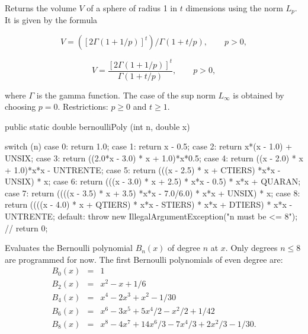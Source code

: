  \begin{tabb} Returns the volume $V$ of a sphere of radius 1 in $t$ dimensions
  using the norm $L_p$. It is given by the formula
\begin{htmlonly}
\[
   V = ([2\Gamma (1 + 1/p)]^t)/\Gamma(1 + t/p), \qquad p > 0,
\]
\end{htmlonly}
\begin{latexonly}
\[
       V = \frac{\left[2 \Gamma (1 + 1/p)\right]^t}
             {\Gamma\left (1 + t/p\right)}, \qquad p > 0,
\]
\end{latexonly}%
where $\Gamma$ is the gamma function.
  The case of the sup norm $L_\infty$ is  obtained by choosing $p=0$.
  Restrictions: $p\ge 0$ and $t\ge 1$.
  \end{tabb}
  \begin{htmlonly}
 \end{htmlonly}
\begin{code}

   public static double bernoulliPoly (int n, double x) \begin{hide} {
      switch (n) {
      case 0:
         return 1.0;
      case 1:
         return x - 0.5;
      case 2:
         return x*(x - 1.0) + UNSIX;
      case 3:
         return ((2.0*x - 3.0) * x + 1.0)*x*0.5;
      case 4:
         return ((x - 2.0) * x + 1.0)*x*x - UNTRENTE;
      case 5:
         return (((x - 2.5) * x + CTIERS) *x*x - UNSIX) * x;
      case 6:
         return (((x - 3.0) * x + 2.5) * x*x - 0.5) * x*x + QUARAN;
      case 7:
         return ((((x - 3.5) * x + 3.5) *x*x - 7.0/6.0) * x*x + UNSIX) * x;
      case 8:
         return ((((x - 4.0) * x +
                  QTIERS) * x*x - STIERS) * x*x + DTIERS) * x*x - UNTRENTE;
      default:
         throw new IllegalArgumentException("n must be <= 8");
      }
    //  return 0;
    }\end{hide}
\end{code}
\begin{tabb} Evaluates the Bernoulli polynomial $B_n(x)$ of degree $n$
  at $x$. Only degrees $n\le 8$ are programmed for now.
 The first Bernoulli polynomials of even degree are:
\begin{eqnarray}
B_0(x) &=& 1 \nonumber \\
B_2(x) &=& x^2-x+1/6 \nonumber \\
B_4(x) &=& x^4-2x^3+x^2-1/30 \label{bernoulli}\\
B_6(x) &=& x^6-3x^5+5x^4/2-x^2/2+1/42 \nonumber \\
B_8(x) &=& x^8-4x^7+14x^6/3 - 7x^4/3 +2x^2/3-1/30. \nonumber
\end{eqnarray}
\end{tabb}

